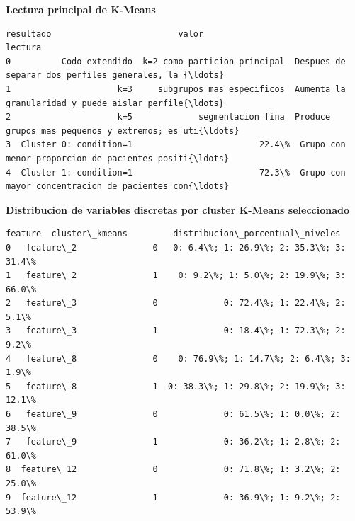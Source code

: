 \documentclass[11pt]{article}
\begin{document}
    
    \textbf{Lectura principal de K-Means}

    
    
    \begin{Verbatim}[commandchars=\\\{\}]
                resultado                         valor                                            lectura
0          Codo extendido  k=2 como particion principal  Despues de separar dos perfiles generales, la {\ldots}
1                     k=3     subgrupos mas especificos  Aumenta la granularidad y puede aislar perfile{\ldots}
2                     k=5             segmentacion fina  Produce grupos mas pequenos y extremos; es uti{\ldots}
3  Cluster 0: condition=1                         22.4\%  Grupo con menor proporcion de pacientes positi{\ldots}
4  Cluster 1: condition=1                         72.3\%  Grupo con mayor concentracion de pacientes con{\ldots}
    \end{Verbatim}

    
    \textbf{Distribucion de variables discretas por cluster K-Means
seleccionado}

    
    
    \begin{Verbatim}[commandchars=\\\{\}]
      feature  cluster\_kmeans         distribucion\_porcentual\_niveles
0   feature\_2               0   0: 6.4\%; 1: 26.9\%; 2: 35.3\%; 3: 31.4\%
1   feature\_2               1    0: 9.2\%; 1: 5.0\%; 2: 19.9\%; 3: 66.0\%
2   feature\_3               0             0: 72.4\%; 1: 22.4\%; 2: 5.1\%
3   feature\_3               1             0: 18.4\%; 1: 72.3\%; 2: 9.2\%
4   feature\_8               0    0: 76.9\%; 1: 14.7\%; 2: 6.4\%; 3: 1.9\%
5   feature\_8               1  0: 38.3\%; 1: 29.8\%; 2: 19.9\%; 3: 12.1\%
6   feature\_9               0             0: 61.5\%; 1: 0.0\%; 2: 38.5\%
7   feature\_9               1             0: 36.2\%; 1: 2.8\%; 2: 61.0\%
8  feature\_12               0             0: 71.8\%; 1: 3.2\%; 2: 25.0\%
9  feature\_12               1             0: 36.9\%; 1: 9.2\%; 2: 53.9\%
    \end{Verbatim}

    
    \begin{center}
    \end{center}
    { \hspace*{\fill} \\}
    
\end{document}

